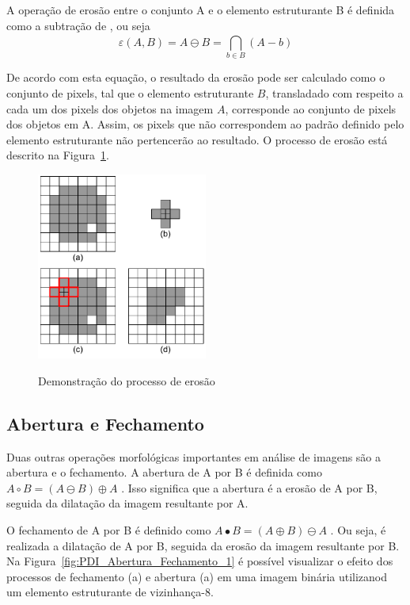 \documentclass[12pt,oneside,a4paper,english,french,spanish,brazil,]{abntex2}
\begin{document}
A operação de erosão entre o conjunto A e o elemento estruturante B é definida como a subtração de \citet{minkowski:1911}, ou seja \[\varepsilon(A,B)=A\ominus B=\bigcap_{b\in B}^{ } (A-b)\]

De acordo com esta equação, o resultado da erosão pode ser calculado como o conjunto de pixels, tal que o elemento estruturante \(B\), transladado com respeito a cada um dos pixels dos objetos na imagem \(A\), corresponde ao conjunto de pixels dos objetos em A. Assim, os pixels que não correspondem ao padrão definido pelo elemento estruturante não pertencerão ao resultado. O processo de erosão está descrito na Figura~\ref{fig:PDI_Erosao_1}.

\begin{figure}[ht]
\centering
\caption{Demonstração do processo de erosão}
\includegraphics[width=0.5\textwidth]{imagens/PDI_Erosao_1.pdf}
\sourceAuthor
\label{fig:PDI_Erosao_1}
\end{figure}

\subsection{Abertura e Fechamento}

Duas outras operações morfológicas importantes em análise de imagens são a abertura e o fechamento. A abertura de A por B é definida como \(A \circ  B = (A \ominus B) \oplus A\) \cite{pedrini:2008}. Isso significa que a abertura é a erosão de A por B, seguida da dilatação da imagem resultante por A.

O fechamento de A por B é definido como \(A \bullet  B = (A \oplus B) \ominus A\) \cite{pedrini:2008}. Ou seja, é realizada a dilatação de A por B, seguida da erosão da imagem resultante por B.
Na Figura~\ref{fig:PDI_Abertura_Fechamento_1} é possível visualizar o efeito dos processos de fechamento (a) e abertura (a) em uma imagem binária utilizanod um elemento estruturante de vizinhança-8.
\end{document}
